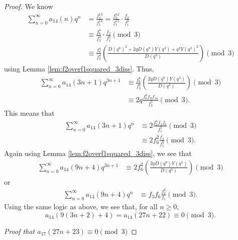 \documentclass[10pt, reqno]{amsart}
\theoremstyle{theorem}
\theoremstyle{definition}
\theoremstyle{example}
\begin{document}
\begin{proof}
\noindent 
We know 
\begin{align*}
\sum_{n=0}^\infty a_{14}(n)q^n 
&= 
\frac{f_2^{13}}{f_1^{14}} = 
\frac{f_2^{12}}{f_1^{12}}\cdot \frac{f_2}{f_1^2} \\
&\equiv 
\frac{f_{6}^4}{f_3^4}\cdot \frac{f_2}{f_1^2} \pmod{3}  \\
&\equiv 
\frac{f_6^4}{f_3^4}\left( \frac{D(q^9)^2 +2qD(q^9)Y(q^3)+q^2Y(q^3)^2}{D(q^3)}  \right) \pmod{3} 
\end{align*}
using Lemma \ref{lem:f2overf1squared_3diss}.  
Thus, 
\begin{align*}
\sum_{n=0}^\infty a_{14}(3n+1)q^{3n+1} 
&\equiv 
\frac{f_6^4}{f_3^4}\left( \frac{2qD(q^9)Y(q^3)}{D(q^3)} \right) \pmod{3}  \\
&\equiv 
2q\frac{f_6^4f_9f_{18}}{f_3^5} \pmod{3}.
\end{align*}
This means that
\begin{align*}
\sum_{n=0}^\infty a_{14}(3n+1)q^{n} 
&\equiv 
2\frac{f_2^4f_3f_{6}}{f_1^5} \pmod{3} \\
&\equiv 
2f_6^2 \frac{f_2}{f_1^2} \pmod{3}.
\end{align*}
Again using Lemma \ref{lem:f2overf1squared_3diss}, we see that 
\begin{align*}
\sum_{n=0}^\infty a_{14}(9n+4)q^{3n+1} 
&\equiv 
2f_6^2 \left( \frac{2qD(q^9)Y(q^3)}{D(q^3)} \right) \pmod{3}
\end{align*}
or 
\begin{align*}
\sum_{n=0}^\infty a_{14}(9n+4)q^{n} 
&\equiv 
f_3f_6\frac{f_2^2}{f_1} \pmod{3}.
\end{align*}
Using the same logic as above, we see that, for all $n\geq 0$, 
\begin{equation*}
a_{14}(9(3n+2)+4) = a_{14}(27n+22) \equiv 0 \pmod{3}. 
\end{equation*}

\bigskip  

\noindent
{\it Proof that $a_{17}(27n+23) \equiv 0 \pmod{3}$}

\bigskip 


\end{proof}
\end{document}
